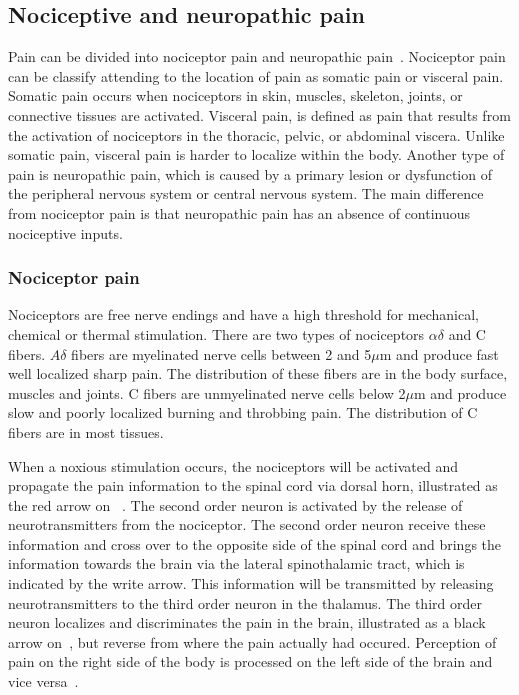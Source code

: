 \subsection{Nociceptive and neuropathic pain}
Pain can be divided into nociceptor pain and neuropathic pain~\cite{Steeds2013}. Nociceptor pain can be classify attending to the location of pain as somatic pain or visceral pain. Somatic pain occurs when nociceptors in skin, muscles, skeleton, joints, or connective tissues are activated. Visceral pain, is defined as pain that results from the activation of nociceptors in the thoracic, pelvic, or abdominal viscera. Unlike somatic pain, visceral pain is harder to localize within the body. Another type of pain is neuropathic pain, which is caused by a primary lesion or dysfunction of the peripheral nervous system or central nervous system. The main difference from nociceptor pain is that neuropathic pain has an absence of continuous nociceptive inputs. \cite{Kerstman2013}

\subsubsection{Nociceptor pain}
Nociceptors are free nerve endings and have a high threshold for mechanical, chemical or thermal stimulation. There are two types of nociceptors $\alpha\delta$ and C fibers. $A\delta$ fibers are myelinated nerve cells between 2 and 5$\mu$m and produce fast well localized sharp pain. The distribution of these fibers are in the body surface, muscles and joints. C fibers are unmyelinated nerve cells below 2$\mu$m and produce slow and poorly localized burning and throbbing pain. The distribution of C fibers are in most tissues. \cite{Steeds2013}

When a noxious stimulation occurs, the nociceptors will be activated and propagate the pain information to the spinal cord via dorsal horn, illustrated as the red arrow on ~\cite{Martini2012}. The second order neuron is activated by the release of neurotransmitters from the nociceptor. The second order neuron receive these information and cross over to the opposite side of the spinal cord and brings the information towards the brain via the lateral spinothalamic tract, which is indicated by the write arrow. This information will be transmitted by releasing neurotransmitters to the third order neuron in the thalamus. The third order neuron localizes and discriminates the pain in the brain, illustrated as a black arrow on~, but reverse from where the pain actually had occured. Perception of pain on the right side of the body is processed on the left side of the brain and vice versa~\cite{Martini2012}. 


